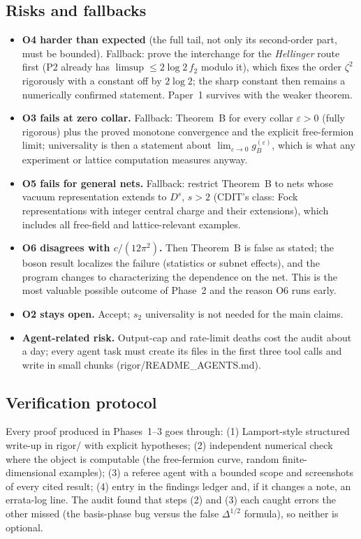\documentclass[11pt]{article}
\theoremstyle{accent}
\theoremstyle{definition}
\newcommand{\eps}{\varepsilon}
\begin{document}
\subsection{Risks and fallbacks}
\begin{itemize}[leftmargin=1.6em,itemsep=1pt]
\item \textbf{O4 harder than expected} (the full tail, not only its second-order part, must be bounded).  Fallback: prove the interchange for the \emph{Hellinger} route first (P2 already has \(\limsup\le2\log2\,f_2\) modulo it), which fixes the order \(\zeta^2\) rigorously with a constant off by \(2\log2\); the sharp constant then remains a numerically confirmed statement.  Paper~1 survives with the weaker theorem.
\item \textbf{O3 fails at zero collar.} Fallback: Theorem~B for every collar \(\eps>0\) (fully rigorous) plus the proved monotone convergence and the explicit free-fermion limit; universality is then a statement about \(\lim_{\eps\to0}g_B^{(\eps)}\), which is what any experiment or lattice computation measures anyway.
\item \textbf{O5 fails for general nets.} Fallback: restrict Theorem~B to nets whose vacuum representation extends to \(D^s\), \(s>2\) (CDIT's class: Fock representations with integer central charge and their extensions), which includes all free-field and lattice-relevant examples.
\item \textbf{O6 disagrees with \(c/(12\pi^2)\).} Then Theorem~B is false as stated; the boson result localizes the failure (statistics or subnet effects), and the program changes to characterizing the dependence on the net.  This is the most valuable possible outcome of Phase~2 and the reason O6 runs early.
\item \textbf{O2 stays open.} Accept; \(s_2\) universality is not needed for the main claims.
\item \textbf{Agent-related risk.} Output-cap and rate-limit deaths cost the audit about a day; every agent task must create its files in the first three tool calls and write in small chunks (rigor/README\_AGENTS.md).
\end{itemize}

\subsection{Verification protocol}
Every proof produced in Phases~1--3 goes through: (1) Lamport-style structured write-up in rigor/ with explicit hypotheses; (2) independent numerical check where the object is computable (the free-fermion curve, random finite-dimensional examples); (3) a referee agent with a bounded scope and screenshots of every cited result; (4) entry in the findings ledger and, if it changes a note, an errata-log line.  The audit found that steps (2) and (3) each caught errors the other missed (the basis-phase bug versus the false \(\Delta^{1/2}\) formula), so neither is optional.
\end{document}
